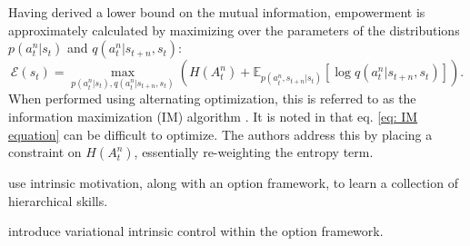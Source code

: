 Having derived a lower bound on the mutual information, empowerment is approximately calculated by maximizing over the parameters of the distributions $p(a^n_t | s_t)$ and $q(a^n_t | s_{t+n}, s_t)$:
\begin{equation}
    \mathcal{E} (s_t) = \max_{p (a^n_t | s_t), q(a^n_t | s_{t+n}, s_t)} \left( H(A^n_t) + \mathbb{E}_{p(a^n_t , s_{t+n} | s_t)} \left[ \log q(a^n_t | s_{t+n}, s_t) \right] \right).
    \label{eq: IM equation}
\end{equation}
When performed using alternating optimization, this is referred to as the information maximization (IM) algorithm \cite{barber2003algorithm}. It is noted in \cite{mohamed2015variational} that eq. \ref{eq: IM equation} can be difficult to optimize. The authors address this by placing a constraint on $H(A^n_t)$, essentially re-weighting the entropy term.


\cite{barto2004intrinsically} use intrinsic motivation, along with an option framework, to learn a collection of hierarchical skills.
\newline

\noindent \cite{gregor2016variational} introduce variational intrinsic control within the option framework.

